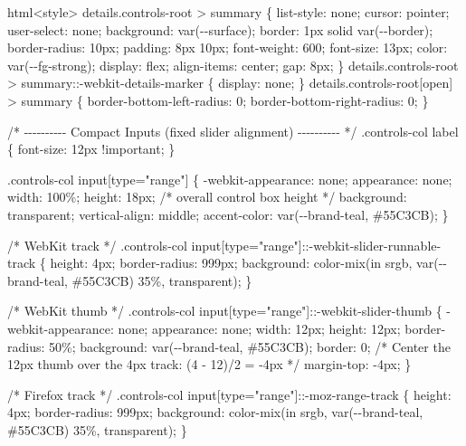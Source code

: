 \documentclass[
  letterpaper,
  DIV=11,
  numbers=noendperiod]{scrreprt}
\newenvironment{Shaded}{\begin{snugshade}}{\end{snugshade}}
\newcommand{\NormalTok}[1]{\textcolor[rgb]{0.00,0.23,0.31}{#1}}
\theoremstyle{definition}
\theoremstyle{plain}
\theoremstyle{definition}
\theoremstyle{remark}
\begin{document}
\begin{Shaded}
\begin{Highlighting}[]
\NormalTok{html\textasciigrave{}\textless{}style\textgreater{}}
\NormalTok{details.controls{-}root \textgreater{} summary \{}
\NormalTok{  list{-}style: none; cursor: pointer; user{-}select: none;}
\NormalTok{  background: var({-}{-}surface);}
\NormalTok{  border: 1px solid var({-}{-}border);}
\NormalTok{  border{-}radius: 10px;}
\NormalTok{  padding: 8px 10px;}
\NormalTok{  font{-}weight: 600; font{-}size: 13px;}
\NormalTok{  color: var({-}{-}fg{-}strong);}
\NormalTok{  display: flex; align{-}items: center; gap: 8px;}
\NormalTok{\}}
\NormalTok{details.controls{-}root \textgreater{} summary::{-}webkit{-}details{-}marker \{ display: none; \}}
\NormalTok{details.controls{-}root[open] \textgreater{} summary \{ border{-}bottom{-}left{-}radius: 0; border{-}bottom{-}right{-}radius: 0; \}}

\NormalTok{/* {-}{-}{-}{-}{-}{-}{-}{-}{-}{-} Compact Inputs (fixed slider alignment) {-}{-}{-}{-}{-}{-}{-}{-}{-}{-} */}
\NormalTok{.controls{-}col label \{ font{-}size: 12px !important; \}}

\NormalTok{.controls{-}col input[type="range"] \{}
\NormalTok{  {-}webkit{-}appearance: none;}
\NormalTok{  appearance: none;}
\NormalTok{  width: 100\%;}
\NormalTok{  height: 18px;                     /* overall control box height */}
\NormalTok{  background: transparent;}
\NormalTok{  vertical{-}align: middle;}
\NormalTok{  accent{-}color: var({-}{-}brand{-}teal, \#55C3CB);}
\NormalTok{\}}

\NormalTok{/* WebKit track */}
\NormalTok{.controls{-}col input[type="range"]::{-}webkit{-}slider{-}runnable{-}track \{}
\NormalTok{  height: 4px;}
\NormalTok{  border{-}radius: 999px;}
\NormalTok{  background: color{-}mix(in srgb, var({-}{-}brand{-}teal, \#55C3CB) 35\%, transparent);}
\NormalTok{\}}

\NormalTok{/* WebKit thumb */}
\NormalTok{.controls{-}col input[type="range"]::{-}webkit{-}slider{-}thumb \{}
\NormalTok{  {-}webkit{-}appearance: none;}
\NormalTok{  appearance: none;}
\NormalTok{  width: 12px; height: 12px; border{-}radius: 50\%;}
\NormalTok{  background: var({-}{-}brand{-}teal, \#55C3CB);}
\NormalTok{  border: 0;}
\NormalTok{  /* Center the 12px thumb over the 4px track: (4 {-} 12)/2 = {-}4px */}
\NormalTok{  margin{-}top: {-}4px;}
\NormalTok{\}}

\NormalTok{/* Firefox track */}
\NormalTok{.controls{-}col input[type="range"]::{-}moz{-}range{-}track \{}
\NormalTok{  height: 4px;}
\NormalTok{  border{-}radius: 999px;}
\NormalTok{  background: color{-}mix(in srgb, var({-}{-}brand{-}teal, \#55C3CB) 35\%, transparent);}
\NormalTok{\}}


\end{Highlighting}
\end{Shaded}
\end{document}

